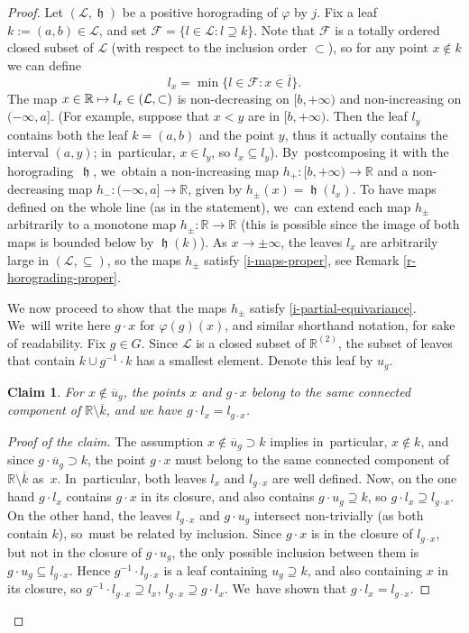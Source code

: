 \documentclass[JEP,XML,SOM,Unicode,NoFloatCountersInSection,published]{cedram}
\def\mto{\mathchoice{\longmapsto}{\mapsto}{\mapsto}{\mapsto}}
\newtheorem*{claim}{Claim}
\theoremstyle{definition}
\DeclareMathOperator{\hor}{\mathfrak{h}}
\newcommand{\R}{\mathbb{R}}
\newcommand{\Lcal}{\mathcal{L}}
\begin{document}
\begin{proof} Let $(\Lcal, \hor)$ be a positive horograding of $\varphi$ by $j$. Fix a leaf ${k}:=(a, b)\in \Lcal$, and set $\mathcal{F}=\{l\in \Lcal: l\supseteq k\}$. Note that $\mathcal{F}$ is a totally ordered closed subset of $\Lcal$ (with respect to the inclusion order $\subset$), so for any point $x\notin {k}$ we can define
\[l_x=\min\{l\in \mathcal{F}: x\in \overline{l}\}.
\]
The map $x\in \R\mto l_x\in (\Lcal, \subset)$ is non-decreasing on $[b, +\infty)$ and non-increasing on $(-\infty, a]$. (For example, suppose that $x < y$ are in $[b, +\infty)$. Then the leaf $l_y$ contains both the leaf $k=(a, b)$ and the point $y$, thus it actually contains the interval $(a, y)$; in~particular, $x\in l_y$, so $l_x\subseteq l_y$). By~postcomposing it with the horograding~$\hor$, we~obtain a non-increasing map $h_+\colon [b, +\infty)\to \R$ and a non-decreasing map $h_-\colon (-\infty, a]\to \R$, given by $h_\pm(x)= \hor(l_x)$.
To have maps defined on the whole line (as in the statement), we~can extend each map $h_\pm$ arbitrarily to a monotone map $h_\pm \colon \R \to \R$ (this is possible since the image of both maps is bounded below by $\hor({k})$). As $x\to \pm \infty$, the leaves $l_x$ are arbitrarily large in $(\Lcal, \subseteq)$, so the maps $h_\pm$ satisfy \eqref{i-maps-proper}, see Remark \ref{r-horograding-proper}.

We now proceed to show that the maps $h_\pm$ satisfy \eqref{i-partial-equivariance}. We~will write here $g\cdot x$ for $\varphi(g)(x)$, and similar shorthand notation, for sake of readability.
Fix $g\in G$. Since $\Lcal$ is a closed subset of $\R^{(2)}$, the subset of leaves that contain ${k}\cup g^{-1}\cdot k$ has a smallest element. Denote this leaf by $u_g$.

\begin{claim}
For $x\notin \overline{u}_g$, the points $x$ and $g\cdot x$ belong to the same connected component of $\R\setminus \overline{k}$, and we have $g\cdot l_x=l_{g\cdot x}$.
\end{claim}
\begin{proof}[Proof of the claim]
The assumption $x\notin \overline{u}_g\supset k$ implies in~particular, $x\notin k$, and since $g\cdot \overline{u}_g\supset {k}$, the point $g\cdot x$ must belong to the same connected component of $\R\setminus \overline{k}$ as~$x$. In~particular, both leaves $l_x$ and $l_{g\cdot x}$ are well defined. Now, on the one hand $g\cdot l_x$ contains $g\cdot x$ in its closure, and also contains $g\cdot u_g\supseteq k$, so $g\cdot l_x\supseteq l_{g\cdot x}$. On the other hand, the leaves $l_{g\cdot x}$ and $g\cdot u_g$ intersect non-trivially (as both contain $k$), so~must be related by inclusion. Since $g\cdot x$ is in the closure of $l_{g\cdot x}$, but not in the closure of $g\cdot u_g$, the only possible inclusion between them is $g\cdot u_g\subseteq l_{g\cdot x}$. Hence $g^{-1}\cdot l_{g\cdot x}$ is a leaf containing $u_g\supseteq k$, and also containing $x$ in its closure, so $g^{-1}\cdot l_{g\cdot x}\supseteq l_{x}$, \ie $l_{g\cdot x}\supseteq g\cdot l_x$. We~have shown that $g\cdot l_x=l_{g\cdot x}$.
\end{proof}


\end{proof}
\end{document}
